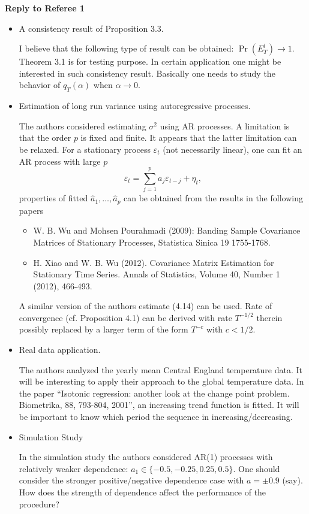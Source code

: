 \documentclass[a4paper,12pt]{article}
\begin{document}
 

\newpage
\begin{center}
{\large \bf Reply to Referee 1} 
\end{center}



\begin{itemize}
\item A consistency result of Proposition 3.3.

I believe that the following type of result can be obtained: $\Pr (E^l_T) \to 1$. Theorem 3.1 is for testing purpose. In certain application one might be interested in such consistency result. Basically one needs to study the behavior of $q_T (\alpha)$ when $\alpha \to 0$.

\item Estimation of long run variance using autoregressive processes.

The authors considered estimating $\sigma^2$ using AR processes. A limitation is that the order $p$ is fixed and finite. It appears that the latter limitation can be relaxed. For a stationary process $\varepsilon_t$ (not necessarily linear), one can fit an AR process with large $p$
$$ \varepsilon_t = \sum_{j=1}^p a_j \varepsilon_{t-j} + \eta_t,$$
properties of fitted $\widehat{a}_1, \ldots, \widehat{a}_p$ can be obtained from the results in the following papers
\begin{itemize}
\item W. B. Wu and Mohsen Pourahmadi (2009): Banding Sample Covariance Matrices of Stationary Processes, Statistica Sinica 19 1755-1768.
\item H. Xiao and W. B. Wu (2012). Covariance Matrix Estimation for Stationary Time Series. Annals of Statistics, Volume 40, Number 1 (2012), 466-493.
\end{itemize}
A similar version of the authors estimate (4.14) can be used. Rate of convergence (cf. Proposition 4.1) can be derived with rate $T^{-1/2}$ therein possibly replaced by a larger term of the form $T^{-c}$ with $c < 1/2$.

\item Real data application.

The authors analyzed the yearly mean Central England temperature data. It will be interesting to apply their approach to the global temperature data. In the paper ``Isotonic regression: another look at the change point problem. Biometrika, 88, 793-804, 2001'', an increasing trend function is fitted. It will be important to know which period the sequence in increasing/decreasing.

\item Simulation Study

In the simulation study the authors considered AR(1) processes with relatively weaker dependence: $a_1 \in \{-0.5, -0.25, 0.25, 0.5\}$. One should consider the stronger positive/negative dependence case with $a = \pm 0.9$ (say). How does the strength of dependence affect the performance of the procedure?

\end{itemize}
\end{document}
